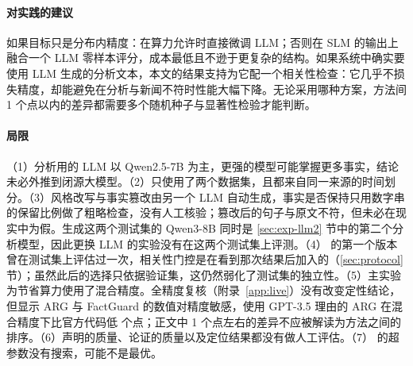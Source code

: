 \paragraph{对实践的建议}
如果目标只是分布内精度：在算力允许时直接微调 LLM；否则在 SLM 的输出上融合一个 LLM 零样本评分，成本最低且不逊于更复杂的结构。如果系统中确实要使用 LLM 生成的分析文本，本文的结果支持为它配一个相关性检查：它几乎不损失精度，却能避免在分析与新闻不符时性能大幅下降。无论采用哪种方案，方法间 1 个点以内的差异都需要多个随机种子与显著性检验才能判断。

\paragraph{局限}
（1）分析用的 LLM 以 Qwen2.5-7B 为主，更强的模型可能掌握更多事实，结论未必外推到闭源大模型。（2）只使用了两个数据集，且都来自同一来源的时间划分。（3）风格改写与事实篡改由另一个 LLM 自动生成，事实是否保持只用数字串的保留比例做了粗略检查，没有人工核验；篡改后的句子与原文不符，但未必在现实中为假。生成这两个测试集的 Qwen3-8B 同时是 \ref{sec:exp-llm2} 节中的第二个分析模型，因此更换 LLM 的实验没有在这两个测试集上评测。（4）\method{} 的第一个版本曾在测试集上评估过一次，相关性门控是在看到那次结果后加入的（\ref{sec:protocol} 节）；虽然此后的选择只依据验证集，这仍然弱化了测试集的独立性。（5）主实验为节省算力使用了混合精度。全精度复核（附录~\ref{app:live}）没有改变定性结论，但显示 ARG 与 FactGuard 的数值对精度敏感，使用 GPT-3.5 理由的 ARG 在混合精度下比官方代码低  个点；正文中 1 个点左右的差异不应被解读为方法之间的排序。（6）声明的质量、论证的质量以及定位结果都没有做人工评估。（7）\method{} 的超参数没有搜索，可能不是最优。
